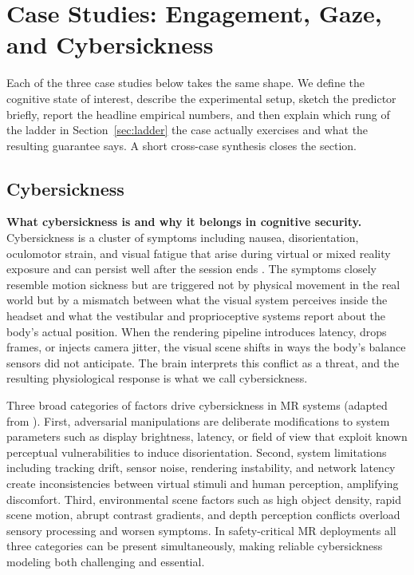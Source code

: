 \documentclass[graybox]{svmult}
\begin{document}
\section{Case Studies: Engagement, Gaze, and Cybersickness}
\label{sec:cases}

Each of the three case studies below takes the same shape. We define the cognitive state of interest, describe the experimental setup, sketch the predictor briefly, report the headline empirical numbers, and then explain which rung of the ladder in Section~\ref{sec:ladder} the case actually exercises and what the resulting guarantee says. A short cross-case synthesis closes the section.

\subsection{Cybersickness}
\label{sec:cybersickness}

\textbf{What cybersickness is and why it belongs in cognitive security.}
Cybersickness is a cluster of symptoms including nausea, disorientation, oculomotor strain, and visual fatigue that arise during virtual or mixed reality exposure and can persist well after the session ends \citep{rebenitsch2016cybersickness}. The symptoms closely resemble motion sickness but are triggered not by physical movement in the real world but by a mismatch between what the visual system perceives inside the headset and what the vestibular and proprioceptive systems report about the body's actual position. When the rendering pipeline introduces latency, drops frames, or injects camera jitter, the visual scene shifts in ways the body's balance sensors did not anticipate. The brain interprets this conflict as a threat, and the resulting physiological response is what we call cybersickness.

Three broad categories of factors drive cybersickness in MR systems (adapted from \cite{}). First, adversarial manipulations are deliberate modifications to system parameters such as display brightness, latency, or field of view that exploit known perceptual vulnerabilities to induce disorientation. Second, system limitations including tracking drift, sensor noise, rendering instability, and network latency create inconsistencies between virtual stimuli and human perception, amplifying discomfort. Third, environmental scene factors such as high object density, rapid scene motion, abrupt contrast gradients, and depth perception conflicts overload sensory processing and worsen symptoms. In safety-critical MR deployments all three categories can be present simultaneously, making reliable cybersickness modeling both challenging and essential.
\end{document}
